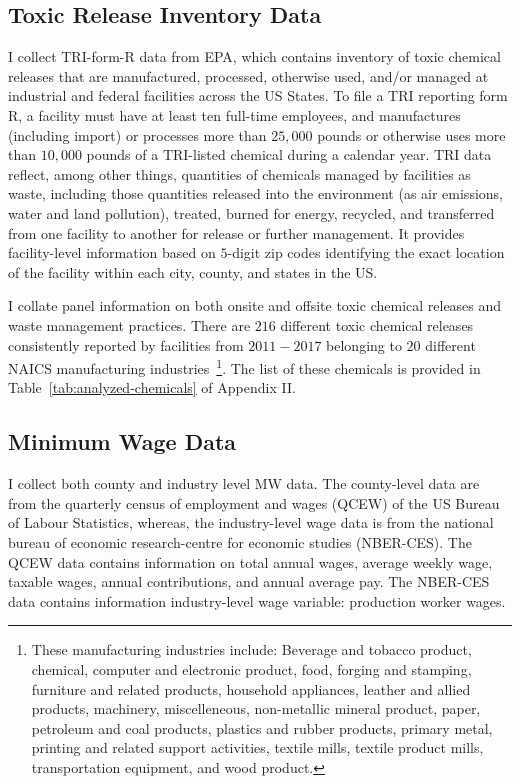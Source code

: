 \documentclass[12pt, english]{article}
\begin{document}
    \subsection{Toxic Release Inventory Data}\label{subsec:toxic-release-inventory-data}
    I collect TRI-form-R data from EPA, which contains inventory of toxic chemical releases that are manufactured, processed, otherwise used, and/or managed at industrial and federal facilities across the US States. To file a TRI reporting form R, a facility must have at least ten full-time employees, and manufactures (including import) or processes more than $25,000$ pounds or otherwise uses more than $10,000$ pounds of a TRI-listed chemical during a calendar year. TRI data reflect, among other things, quantities of chemicals managed by facilities as waste, including those quantities released into the environment (as air emissions, water and land pollution), treated, burned for energy, recycled, and transferred from one facility to another for release or further management. It provides facility-level information based on $5$-digit zip codes identifying the exact location of the facility within each city, county, and states in the US.

    I collate panel information on both onsite and offsite toxic chemical releases and waste management practices. There are $216$ different toxic chemical releases consistently reported by facilities from $2011-2017$ belonging to $20$ different NAICS manufacturing industries~\footnote{\tiny These manufacturing industries include: Beverage and tobacco product, chemical, computer and electronic product, food, forging and stamping, furniture and related products, household appliances, leather and allied products, machinery, miscelleneous, non-metallic mineral product, paper, petroleum and coal products, plastics and rubber products, primary metal, printing and related support activities, textile mills, textile product mills, transportation equipment, and wood product.}. The list of these chemicals is provided in Table~\ref{tab:analyzed-chemicals} of Appendix II.

    \subsection{Minimum Wage Data}\label{subsec:minimum-wage-data}
    I collect both county and industry level MW data. The county-level data are from the quarterly census of employment and wages (QCEW) of the US Bureau of Labour Statistics, whereas, the industry-level wage data is from the national bureau of economic research-centre for economic studies (NBER-CES). The QCEW data contains information on total annual wages, average weekly wage, taxable wages, annual contributions, and annual average pay. The NBER-CES data contains information industry-level wage variable: production worker wages.
\end{document}
